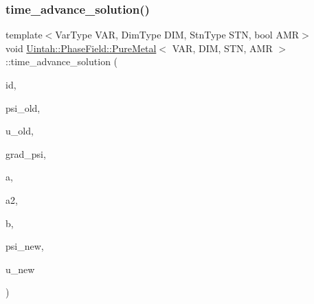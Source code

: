 \subsubsection{\texorpdfstring{time\+\_\+advance\+\_\+solution()}{time\_advance\_solution()}}
{\footnotesize\ttfamily template$<$Var\+Type V\+AR, Dim\+Type D\+IM, Stn\+Type S\+TN, bool A\+MR$>$ \\
void \hyperlink{classUintah_1_1PhaseField_1_1PureMetal}{Uintah\+::\+Phase\+Field\+::\+Pure\+Metal}$<$ V\+AR, D\+IM, S\+TN, A\+MR $>$\+::time\+\_\+advance\+\_\+solution (\begin{DoxyParamCaption}\item[{const Int\+Vector \&}]{id,  }\item[{\hyperlink{namespaceUintah_1_1PhaseField_a63032464b1cd54eaa53c1c29109746ac}{F\+D\+View}$<$ \hyperlink{structUintah_1_1PhaseField_1_1ScalarField}{Scalar\+Field}$<$ const double $>$, S\+TN $>$ \&}]{psi\+\_\+old,  }\item[{\hyperlink{namespaceUintah_1_1PhaseField_a63032464b1cd54eaa53c1c29109746ac}{F\+D\+View}$<$ \hyperlink{structUintah_1_1PhaseField_1_1ScalarField}{Scalar\+Field}$<$ const double $>$, S\+TN $>$ \&}]{u\+\_\+old,  }\item[{\hyperlink{namespaceUintah_1_1PhaseField_a59210a1e28eba254d428762c92ddeabb}{View}$<$ \hyperlink{structUintah_1_1PhaseField_1_1VectorField}{Vector\+Field}$<$ const double, D\+IM $>$ $>$ \&}]{grad\+\_\+psi,  }\item[{\hyperlink{namespaceUintah_1_1PhaseField_a59210a1e28eba254d428762c92ddeabb}{View}$<$ \hyperlink{structUintah_1_1PhaseField_1_1ScalarField}{Scalar\+Field}$<$ const double $>$ $>$ \&}]{a,  }\item[{\hyperlink{namespaceUintah_1_1PhaseField_a63032464b1cd54eaa53c1c29109746ac}{F\+D\+View}$<$ \hyperlink{structUintah_1_1PhaseField_1_1ScalarField}{Scalar\+Field}$<$ const double $>$, S\+TN $>$ \&}]{a2,  }\item[{\hyperlink{namespaceUintah_1_1PhaseField_a63032464b1cd54eaa53c1c29109746ac}{F\+D\+View}$<$ \hyperlink{structUintah_1_1PhaseField_1_1VectorField}{Vector\+Field}$<$ const double, B\+SZ $>$, S\+TN $>$ \&}]{b,  }\item[{\hyperlink{namespaceUintah_1_1PhaseField_a59210a1e28eba254d428762c92ddeabb}{View}$<$ \hyperlink{structUintah_1_1PhaseField_1_1ScalarField}{Scalar\+Field}$<$ double $>$ $>$ \&}]{psi\+\_\+new,  }\item[{\hyperlink{namespaceUintah_1_1PhaseField_a59210a1e28eba254d428762c92ddeabb}{View}$<$ \hyperlink{structUintah_1_1PhaseField_1_1ScalarField}{Scalar\+Field}$<$ double $>$ $>$ \&}]{u\+\_\+new }\end{DoxyParamCaption})\hspace{0.3cm}{\ttfamily [protected]}}



